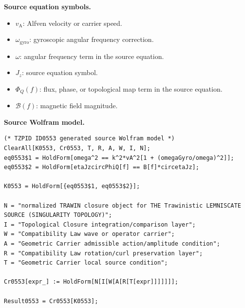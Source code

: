 \begin{minipage}[t]{0.49\linewidth}
\begingroup
\small
\raggedright
\textbf{Source equation symbols.}\par
\begin{itemize}[leftmargin=1.35em,itemsep=1pt,topsep=1pt,parsep=0pt]
    \item $v_{\mathrm{A}}$: Alfven velocity or carrier speed.
    \item $\omega_{\mathrm{gyro}}$: gyroscopic angular frequency correction.
    \item $\omega$: angular frequency term in the source equation.
    \item $J_z$: source equation symbol.
    \item $\Phi_Q(f)$: flux, phase, or topological map term in the source equation.
    \item $\mathcal{B}(f)$: magnetic field magnitude.
\end{itemize}
\endgroup
\end{minipage}\hfill
\begin{minipage}[t]{0.47\linewidth}
\begingroup
\scriptsize
\raggedright
\textbf{Source Wolfram model.}\par
\begin{Verbatim}[fontsize=\tiny,breaklines=true,breakanywhere=true]
(* TZPID ID0553 generated source Wolfram model *)
ClearAll[K0553, Cr0553, T, R, A, W, I, N];
eq0553$1 = HoldForm[omega^2 == k^2*vA^2[1 + (omegaGyro/omega)^2]];
eq0553$2 = HoldForm[etaJzcircPhiQ[f] == B[f]*circetaJz];

K0553 = HoldForm[{eq0553$1, eq0553$2}];

N = "normalized TRAWIN closure object for THE Trawinistic LEMNISCATE SOURCE (SINGULARITY TOPOLOGY)";
I = "Topological Closure integration/comparison layer";
W = "Compatibility Law wave or operator carrier";
A = "Geometric Carrier admissible action/amplitude condition";
R = "Compatibility Law rotation/curl preservation layer";
T = "Geometric Carrier local source condition";

Cr0553[expr_] := HoldForm[N[I[W[A[R[T[expr]]]]]]];

Result0553 = Cr0553[K0553];
\end{Verbatim}
\endgroup
\end{minipage}

